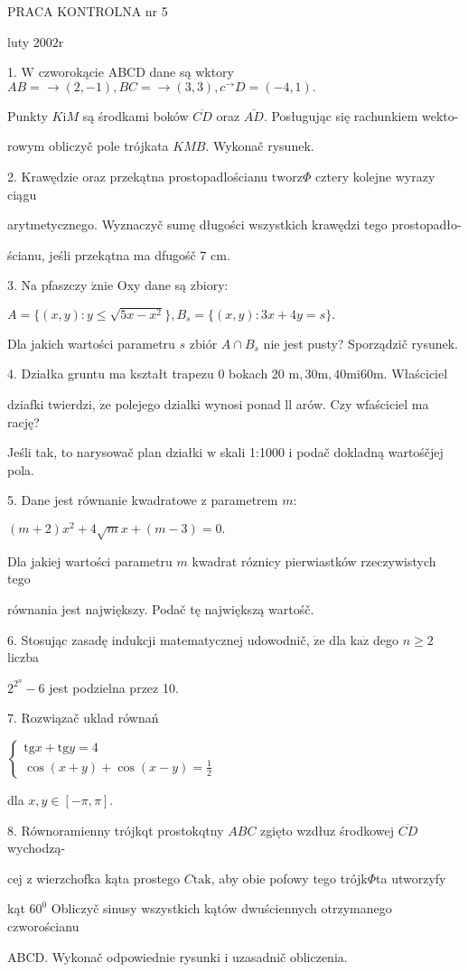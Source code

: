 \documentclass[a4paper,12pt]{article}
\begin{document}
PRACA KONTROLNA nr 5

luty $2002\mathrm{r}$

1. $\mathrm{W}$ czworokącie ABCD dane są wktory $AB=\rightarrow(2,-1), BC=\rightarrow(3,3), c^{\rightarrow}D=(-4,1).$

Punkty $K\mathrm{i}M$ są środkami boków $\overline{CD}$ oraz $\overline{AD}$. Posługując się rachunkiem wekto-

rowym obliczyč pole trójkata $KMB$. Wykonač rysunek.

2. Krawędzie oraz przekątna prostopadlościanu $\mathrm{t}\mathrm{w}\mathrm{o}\mathrm{r}\mathrm{z}\Phi$ cztery kolejne wyrazy ciągu

arytmetycznego. Wyznaczyč sumę długości wszystkich krawędzi tego prostopadło-

ścianu, jeśli przekątna ma dfugośč 7 cm.

3. Na pfaszczy $\acute{\mathrm{z}}\mathrm{n}\mathrm{i}\mathrm{e}$ Oxy dane są zbiory:

$A=\{(x,y):y\leq\sqrt{5x-x^{2}}\},B_{s}=\{(x,y):3x+4y=s\}.$

Dla jakich wartości parametru $s$ zbiór $A\cap B_{s}$ nie jest pusty? Sporządzič rysunek.

4. Działka gruntu ma kształt trapezu $0$ bokach 20 $\mathrm{m}, 30\mathrm{m}, 40\mathrm{m}\mathrm{i}60\mathrm{m}$. Właściciel

dziafki twierdzi, $\dot{\mathrm{z}}\mathrm{e}$ polejego dzialki wynosi ponad ll arów. Czy wfaściciel ma rację?

Jeśli tak, to narysowač plan działki $\mathrm{w}$ skali 1:1000 $\mathrm{i}$ podač dokladną wartośčjej pola.

5. Dane jest równanie kwadratowe $\mathrm{z}$ parametrem $m$:

$(m+2)x^{2}+4\sqrt{m}x+(m-3)=0.$

Dla jakiej wartości parametru $m$ kwadrat róznicy pierwiastków rzeczywistych tego

równania jest największy. Podač tę największą wartośč.

6. Stosując zasadę indukcji matematycznej udowodnič, $\dot{\mathrm{z}}\mathrm{e}$ dla $\mathrm{k}\mathrm{a}\dot{\mathrm{z}}$ dego $n \geq 2$ liczba

$2^{2^{n}}-6$ jest podzielna przez 10.

7. Rozwiązač uklad równań

$\left\{\begin{array}{l}
\mathrm{t}\mathrm{g}x+\mathrm{t}\mathrm{g}y=4\\
\cos(x+y)+\cos(x-y)=\frac{1}{2}
\end{array}\right.$

dla $x, y\in[-\pi,\pi].$

8. Równoramienny trójkqt prostokqtny $ABC$ zgięto wzdłuz środkowej $\overline{CD}$ wychodzą-

cej $\mathrm{z}$ wierzchofka kąta prostego $C\mathrm{t}\mathrm{a}\mathrm{k}$, aby obie pofowy tego trójk$\Phi$ta utworzyfy

kąt $60^{0}$ Obliczyč sinusy wszystkich kątów dwuściennych otrzymanego czworościanu

ABCD. Wykonač odpowiednie rysunki $\mathrm{i}$ uzasadnič obliczenia.
\end{document}
